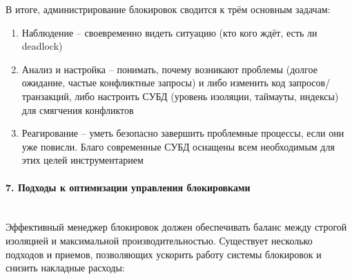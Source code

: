  В итоге, администрирование блокировок сводится к трём основным задачам: 
 \begin{enumerate}
    \item Наблюдение – своевременно видеть ситуацию (кто кого ждёт, есть ли deadlock)
    \item Анализ и настройка – понимать, почему возникают проблемы (долгое ожидание, частые конфликтные запросы) и либо изменить код запросов/транзакций, либо настроить СУБД (уровень изоляции, таймауты, индексы) для смягчения конфликтов
    \item Реагирование – уметь безопасно завершить проблемные процессы, если они уже повисли. Благо современные СУБД оснащены всем необходимым для этих целей инструментарием
 \end{enumerate}

\paragraph{7. Подходы к оптимизации управления блокировками} ~\\
 Эффективный менеджер блокировок должен обеспечивать баланс между строгой изоляцией и максимальной производительностью. Существует несколько подходов и приемов, позволяющих ускорить работу системы блокировок и снизить накладные расходы: 
